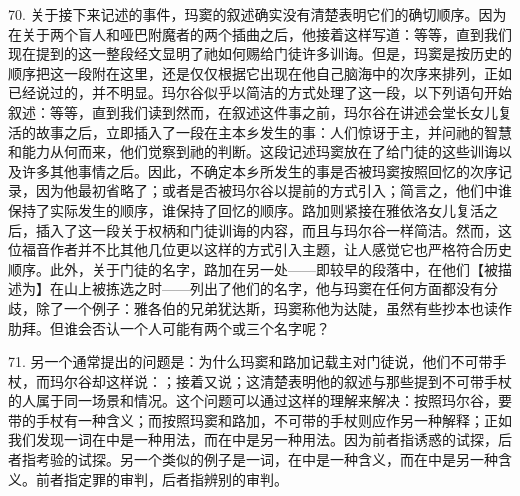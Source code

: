 70. 关于接下来记述的事件，玛窦的叙述确实没有清楚表明它们的确切顺序。因为在关于两个盲人和哑巴附魔者的两个插曲之后，他接着这样写道：等等，直到我们现在提到的这一整段经文显明了祂如何赐给门徒许多训诲。但是，玛窦是按历史的顺序把这一段附在这里，还是仅仅根据它出现在他自己脑海中的次序来排列，正如已经说过的，并不明显。玛尔谷似乎以简洁的方式处理了这一段，以下列语句开始叙述：等等，直到我们读到然而，在叙述这件事之前，玛尔谷在讲述会堂长女儿复活的故事之后，立即插入了一段在主本乡发生的事：人们惊讶于主，并问祂的智慧和能力从何而来，他们觉察到祂的判断。这段记述玛窦放在了给门徒的这些训诲以及许多其他事情之后。因此，不确定本乡所发生的事是否被玛窦按照回忆的次序记录，因为他最初省略了；或者是否被玛尔谷以提前的方式引入；简言之，他们中谁保持了实际发生的顺序，谁保持了回忆的顺序。路加则紧接在雅依洛女儿复活之后，插入了这一段关于权柄和门徒训诲的内容，而且与玛尔谷一样简洁。然而，这位福音作者并不比其他几位更以这样的方式引入主题，让人感觉它也严格符合历史顺序。此外，关于门徒的名字，路加在另一处——即较早的段落中，在他们【被描述为】在山上被拣选之时——列出了他们的名字，他与玛窦在任何方面都没有分歧，除了一个例子：雅各伯的兄弟犹达斯，玛窦称他为达陡，虽然有些抄本也读作肋拜。但谁会否认一个人可能有两个或三个名字呢？\par

71. 另一个通常提出的问题是：为什么玛窦和路加记载主对门徒说，他们不可带手杖，而玛尔谷却这样说：；接着又说；这清楚表明他的叙述与那些提到不可带手杖的人属于同一场景和情况。这个问题可以通过这样的理解来解决：按照玛尔谷，要带的手杖有一种含义；而按照玛窦和路加，不可带的手杖则应作另一种解释；正如我们发现一词在中是一种用法，而在中是另一种用法。因为前者指诱惑的试探，后者指考验的试探。另一个类似的例子是一词，在中是一种含义，而在中是另一种含义。前者指定罪的审判，后者指辨别的审判。\par

